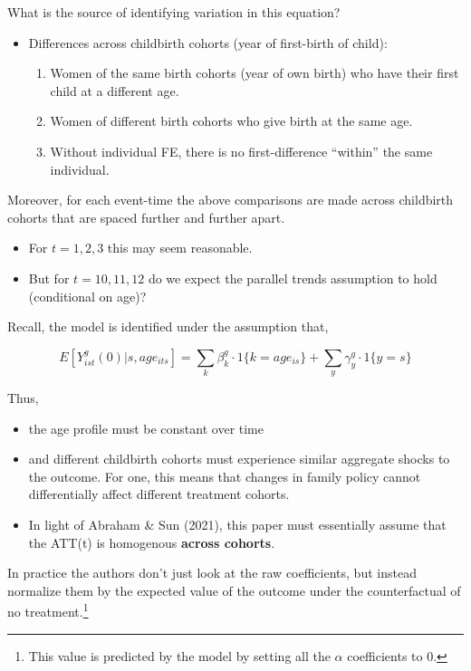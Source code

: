 \documentclass[
  letterpaper,
  DIV=11,
  numbers=noendperiod]{scrreprt}
\providecommand{\tightlist}{%
  \setlength{\itemsep}{0pt}\setlength{\parskip}{0pt}}\usepackage{longtable,booktabs,array}
\theoremstyle{definition}
\theoremstyle{remark}
\begin{document}
What is the source of identifying variation in this equation?

\begin{itemize}
\tightlist
\item
  Differences across childbirth cohorts (year of first-birth of child):

  \begin{enumerate}
  \def\labelenumi{\arabic{enumi}.}
  \tightlist
  \item
    Women of the same birth cohorts (year of own birth) who have their
    first child at a different age.
  \item
    Women of different birth cohorts who give birth at the same age.
  \item
    Without individual FE, there is no first-difference ``within'' the
    same individual.
  \end{enumerate}
\end{itemize}

Moreover, for each event-time the above comparisons are made across
childbirth cohorts that are spaced further and further apart.

\begin{itemize}
\tightlist
\item
  For \(t=1,2,3\) this may seem reasonable.
\item
  But for \(t=10,11,12\) do we expect the parallel trends assumption to
  hold (conditional on age)?
\end{itemize}

Recall, the model is identified under the assumption that,

\[
E[Y^g_{ist}(0)|s,age_{its}] = \sum_{k}\beta^g_k\cdot1\{k=age_{is}\}+\sum_y\gamma^g_y\cdot1\{y=s\}
\]

Thus,

\begin{itemize}
\tightlist
\item
  the age profile must be constant over time
\item
  and different childbirth cohorts must experience similar aggregate
  shocks to the outcome. For one, this means that changes in family
  policy cannot differentially affect different treatment cohorts.
\item
  In light of Abraham \& Sun (2021), this paper must essentially assume
  that the ATT(t) is homogenous \textbf{across cohorts}.
\end{itemize}

In practice the authors don't just look at the raw coefficients, but
instead normalize them by the expected value of the outcome under the
counterfactual of no treatment.\footnote{This value is predicted by the
  model by setting all the \(\alpha\) coefficients to 0.}
\end{document}
